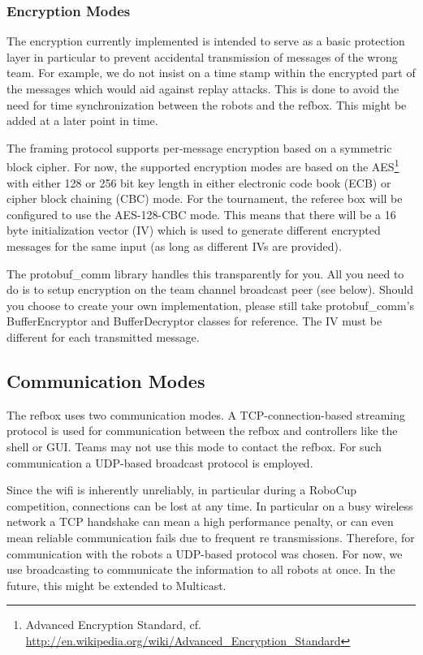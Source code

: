 \documentclass[a4paper]{article}
\begin{document}
\subsubsection{Encryption Modes}
The encryption currently implemented is intended to serve as a basic
protection layer in particular to prevent accidental transmission of
messages of the wrong team. For example, we do not insist on a
time stamp within the encrypted part of the messages which would aid
against replay attacks. This is done to avoid the need for time
synchronization between the robots and the refbox. This might be added
at a later point in time.

The framing protocol supports per-message encryption based on a
symmetric block cipher. For now, the supported encryption modes are
based on the AES\footnote{Advanced Encryption Standard,
  cf. \url{http://en.wikipedia.org/wiki/Advanced_Encryption_Standard}}
with either 128 or 256 bit key length in either electronic code book
(ECB) or cipher block chaining (CBC) mode. For the tournament, the
referee box will be configured to use the AES-128-CBC mode. This means
that there will be a 16 byte initialization vector (IV) which is used
to generate different encrypted messages for the same input (as long
as different IVs are provided).

The protobuf\_comm library handles this transparently for you. All you
need to do is to setup encryption on the team channel broadcast peer
(see below). Should you choose to create your own implementation,
please still take protobuf\_comm's BufferEncryptor and BufferDecryptor
classes for reference. The IV must be different for each transmitted
message.

\subsection{Communication Modes}
The refbox uses two communication modes. A TCP-connection-based
streaming protocol is used for communication between the refbox and
controllers like the shell or GUI. Teams may not use this mode to
contact the refbox. For such communication a UDP-based broadcast
protocol is employed.

Since the wifi is inherently unreliably, in particular during a
RoboCup competition, connections can be lost at any time. In
particular on a busy wireless network a TCP handshake can mean a
high performance penalty, or can even mean reliable communication
fails due to frequent re transmissions. Therefore, for
communication with the robots a UDP-based protocol was chosen. For
now, we use broadcasting to communicate the information to all
robots at once. In the future, this might be extended to Multicast.
\end{document}
